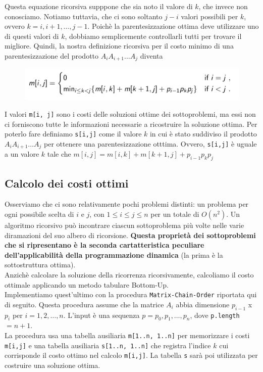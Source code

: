 Questa equazione ricorsiva supppone che sia noto il valore di $k$, che
invece non conosciamo. Notiamo tuttavia, che ci sono soltanto $j-i$
valori possibili per $k$, ovvero $k=i, i+1, \ldots, j-1$. Poichè la
parentesizzazione ottima deve utilizzare uno di questi valori di $k$,
dobbiamo semplicemente controllarli tutti per trovare il migliore.
Quindi, la nostra definizione ricorsiva per il costo minimo di una
parentesizzazione del prodotto $A_i A_{i+1} \ldots A_j$ diventa

\begin{figure}[H]
\centering
  \includegraphics[width=15cm, keepaspectratio]{Programmazione_dinamica/imgs/matrix2.png}
\end{figure}

I valori \texttt{m[i,\ j]} sono i costi delle soluzioni ottime dei
sottoproblemi, ma essi non ci forniscono tutte le informazioni
necessarie a ricostruire la soluzione ottima. Per poterlo fare definiamo
\texttt{s[i,j]} come il valore $k$ in cui è stato suddiviso il
prodotto $A_{i} A_{i+1} \ldots A_j$ per ottenere una parentesizzazione
otttima. Ovvero, \texttt{s[i,j]} è uguale a un valore $k$ tale che
$m[i,j] = m[i,k] + m[k+1,j] + p_{i-1} p_k p_j$

\subsection{Calcolo dei costi ottimi}

Osserviamo che ci sono relativamente pochi problemi distinti: un
problema per ogni possibile scelta di $i$ e $j$, con
$1 \le i \le j \le n$ per un totale di $O(n^2)$. Un algoritmo
ricorsivo può incontrare ciascun sottoproblema più volte nelle varie
diramazioni del suo albero di ricorsione. \textbf{Questa proprietà dei
  sottoproblemi che si ripresentano è la seconda cartatteristica peculiare
  dell'applicabilità della programmazione dinamica} (la prima è la
sottostruttura ottima).\\

Anzichè calcolare la soluzione della ricorrenza ricorsivamente,
calcoliamo il costo ottimale applicando un metodo tabulare Bottom-Up.\\
Implementiamo quest'ultimo con la procedura \texttt{Matrix-Chain-Order}
riportata qui di seguito. Questa procedura assume che la matrice $A_i$
abbia dimensione $p_{i-1}$ x $p_i$ per $i=1,2,\ldots,n$. L'input è una
sequenza $p = p_0, p_1, \ldots, p_n$, dove \texttt{p.length} $= n+1$.\\
La procedura usa una tabella ausiliaria \texttt{m[1..n,\ 1..n]} per
memorizzare i costi \texttt{m[i,j]} e una tabella ausiliaria
\texttt{s[1..n,\ 1..n]} che registra l'indice $k$ cui corrisponde
il costo ottimo nel calcolo \texttt{m[i,j]}. La tabella \texttt{s}
sarà poi utilizzata per costruire una soluzione ottima.\\

